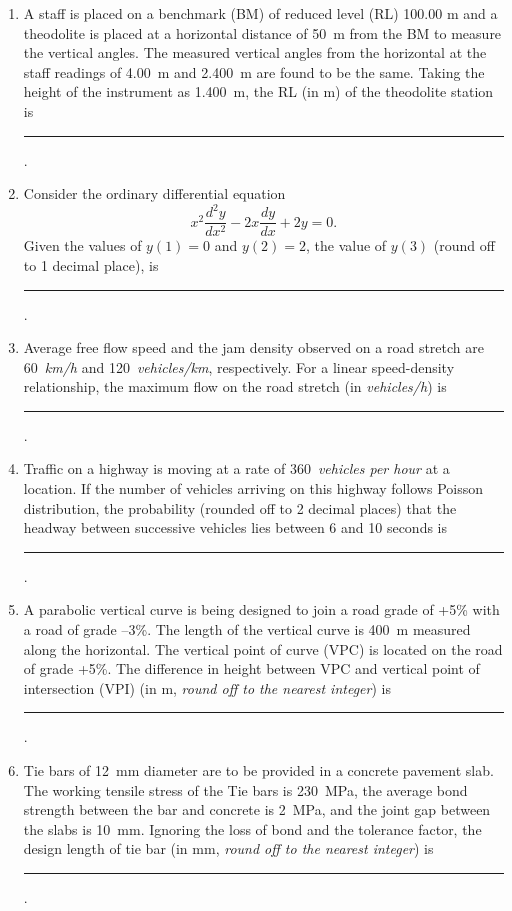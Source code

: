 \documentclass[12pt]{article}
\begin{document}
\begin{enumerate}[label= Q.\arabic*,start =26]
	\item A staff is placed on a benchmark (BM) of reduced level (RL) 100.00 m and a theodolite is placed at a horizontal distance of 50~m from the BM to measure the vertical angles. The measured vertical angles from the horizontal at the staff readings of 4.00~m and 2.400~m are found to be the same. Taking the height of the instrument as 1.400~m, the RL (in m) of the theodolite station is \rule{3cm}{0.15mm}.

		\vspace{4mm}

	\item Consider the ordinary differential equation 
		\[
			x^2 \dfrac{d^2 y}{dx^2} - 2x \dfrac{dy}{dx} + 2y = 0.
		\]
		Given the values of \( y(1) = 0 \) and \( y(2) = 2 \), the value of \( y(3) \) (round off to 1 decimal place), is \rule{3cm}{0.15mm}.

		\vspace{4mm}

	\item  Average free flow speed and the jam density observed on a road stretch are 60~\textit{km/h} and 120~\textit{vehicles/km}, respectively. For a linear speed-density relationship, the maximum flow on the road stretch (in \textit{vehicles/h}) is \rule{3cm}{0.15mm}.


	\item  Traffic on a highway is moving at a rate of 360~\textit{vehicles per hour} at a location. If the number of vehicles arriving on this highway follows Poisson distribution, the probability (rounded off to 2 decimal places) that the headway between successive vehicles lies between 6 and 10 seconds is \rule{3cm}{0.15mm}.

		\vspace{4mm}

	\item  A parabolic vertical curve is being designed to join a road grade of +5\% with a road of grade --3\%. The length of the vertical curve is 400~m measured along the horizontal. The vertical point of curve (VPC) is located on the road of grade +5\%. The difference in height between VPC and vertical point of intersection (VPI) (in m, \textit{round off to the nearest integer}) is \rule{3cm}{0.15mm}.

		\vspace{4mm}

	\item  Tie bars of 12~mm diameter are to be provided in a concrete pavement slab. The working tensile stress of the Tie bars is 230~MPa, the average bond strength between the bar and concrete is 2~MPa, and the joint gap between the slabs is 10~mm. Ignoring the loss of bond and the tolerance factor, the design length of tie bar (in mm, \textit{round off to the nearest integer}) is \rule{3cm}{0.15mm}.


\end{enumerate}
\end{document}
